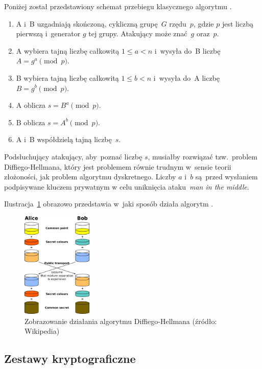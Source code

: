 \documentclass[thesis]{subfiles}
\begin{document}
Poniżej został przedstawiony schemat przebiegu klasycznego algorytmu .

\begin{enumerate}
\item A i~B uzgadniają skończoną, cykliczną grupę~$G$ rzędu~$p$, gdzie $p$ jest liczbą pierwszą i~generator $g$ tej grupy. Atakujący może znać~$g$ oraz~$p$.
\item A wybiera tajną liczbę całkowitą $1 \leq a < n$ i~wysyła do~B liczbę $A=g^a \pmod{p}$.
\item B wybiera tajną liczbę całkowitą $1 \leq b < n$ i~wysyła do~A liczbę $B=g^b \pmod{p}$.
\item A oblicza $s=B^a \pmod{p}$.
\item B oblicza $s=A^b \pmod{p}$.
\item A i~B współdzielą tajną liczbę~$s$.
\end{enumerate}

Podsłuchujący atakujący, aby~poznać liczbę $s$, musiałby rozwiązać tzw.~problem Diffiego-Hellmana, który jest problemem równie trudnym w~sensie teorii złożoności, jak problem algorytmu dyskretnego. Liczby $a$ i~$b$ są~przed wysłaniem podpisywane kluczem prywatnym w celu uniknięcia ataku~\emph{man in the middle}.

Ilustracja~\ref{fig:dh} obrazowo przedstawia w~jaki sposób działa algorytm .

\begin{figure}[hb]
	\centering
	\includegraphics[width=0.3\textwidth]{img/Diffie-Hellman_Key_Exchange.pdf}
	\caption{Zobrazowanie działania algorytmu Diffiego-Hellmana (źródło: Wikipedia)}
	\label{fig:dh}
\end{figure}


\subsection{Zestawy kryptograficzne}
\end{document}
